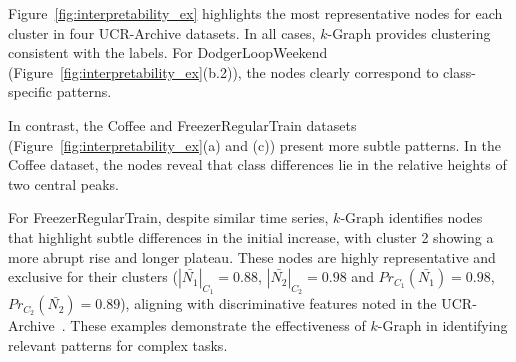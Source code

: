 

 Figure~\ref{fig:interpretability_ex} highlights the most representative nodes for each cluster in four UCR-Archive datasets. In all cases, $k$-Graph provides clustering consistent with the labels. For DodgerLoopWeekend
(Figure~\ref{fig:interpretability_ex}(b.2)),
the nodes clearly correspond to class-specific patterns. 

In contrast, the Coffee and FreezerRegularTrain datasets (Figure~\ref{fig:interpretability_ex}(a) and (c)) present more subtle patterns. In the Coffee dataset, the nodes reveal that class differences lie in the relative heights of two central peaks. 

For FreezerRegularTrain, despite similar time series, $k$-Graph identifies nodes that highlight subtle differences in the initial increase, with cluster 2 showing a more abrupt rise and longer plateau. These nodes are highly representative and exclusive for their clusters ($|\bar{N_1}|_{C_1}=0.88$, $|\bar{N_2}|_{C_2}=0.98$ and $Pr_{C_1}(\bar{N_1})=0.98$, $Pr_{C_2}(\bar{N_2})=0.89$), aligning with discriminative features noted in the UCR-Archive~\cite{Dau2018TheUT}. These examples demonstrate the effectiveness of $k$-Graph in identifying relevant patterns for complex tasks.





